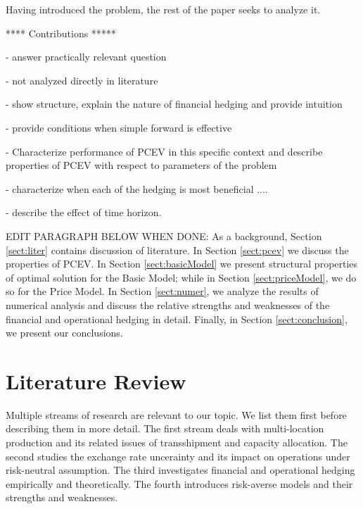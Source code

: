 \documentclass[mnsc,nonblindrev,copyedit]{informs2_wz} %
\newcommand{\OUT}[1]{}
\begin{document}
Having introduced the problem, the rest of the paper seeks to analyze it.  


**** Contributions *****

- answer practically relevant question

- not analyzed directly in literature

- show structure, explain the nature of financial hedging and provide intuition

- provide conditions when simple forward is effective

- Characterize performance of PCEV in this specific context and describe properties of PCEV with respect to parameters of the problem

- characterize when each of the hedging is most beneficial ....

- describe the effect of time horizon.

EDIT PARAGRAPH BELOW WHEN DONE:
As a background, Section \ref{sect:liter} contains discussion of literature. In Section \ref{sect:pcev} we discuss the properties of PCEV. In Section \ref{sect:basicModel} we present structural properties of optimal solution for the Basic Model; while in Section \ref{sect:priceModel}, we do so for the Price Model.  In Section \ref{sect:numer}, we analyze the results of numerical analysis and discuss the relative strengths and weaknesses of the financial and operational hedging in detail.  Finally, in Section \ref{sect:conclusion}, we present our conclusions.





\section{Literature Review \label{sect:liter}}
\OUT{
1. RISK AVERSION - briefly and say that the next section deals in more detail.

2. EXCHANGE RATE

3. TRANSPORTATION

4. FINANCIAL AND OPERATIONAL HEDGING
	EMPIRICAL
	THEORETICAL


Multiple streams of literature are related to our problem.  The first stream introduces various ways of modeling risk-averse attitudes across extended horizon.  The second stream describes analysis of problems that involve exchange-rate uncertainty.  The third stream includes analysis of multi-location problems.  In the final fourth category, we discuss relevant empirical and theoretical literature related to comparison of financial and operational hedging.






\medskip
}
Multiple streams of research are relevant to our topic.  We list them first before describing them in more detail. The first stream deals with multi-location production and its related issues of transshipment and capacity allocation. The second studies the exchange rate uncerainty and its impact on operations under risk-neutral assumption. The third investigates financial and operational hedging empirically and theoretically. The fourth introduces risk-averse models and their strengths and weaknesses. 
\end{document}
